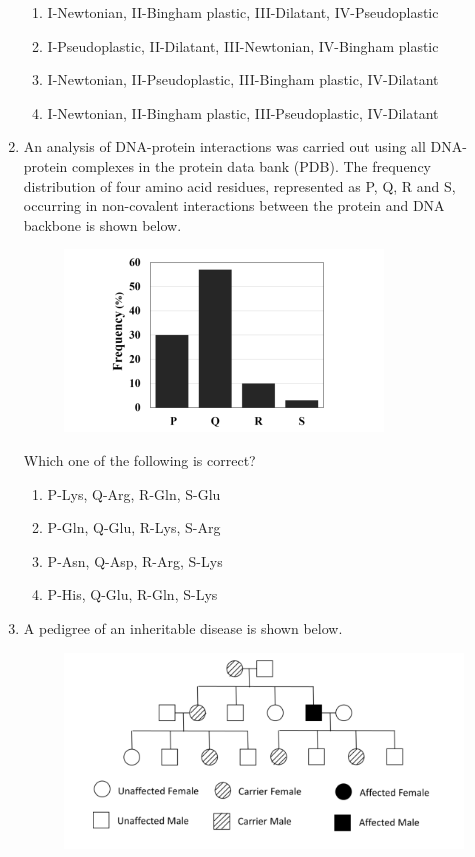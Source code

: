 \documentclass[journal,12pt,onecolumn]{IEEEtran}
\theoremstyle{remark}
\begin{document}
\begin{enumerate}
    \begin{enumerate}
        \item I-Newtonian, II-Bingham plastic, III-Dilatant, IV-Pseudoplastic
        \item I-Pseudoplastic, II-Dilatant, III-Newtonian, IV-Bingham plastic
        \item I-Newtonian, II-Pseudoplastic, III-Bingham plastic, IV-Dilatant
        \item I-Newtonian, II-Bingham plastic, III-Pseudoplastic, IV-Dilatant
    \end{enumerate}
    
    \item An analysis of DNA-protein interactions was carried out using all DNA-protein complexes in the protein data bank (PDB). The frequency distribution of four amino acid residues, represented as P, Q, R and S, occurring in non-covalent interactions between the protein and DNA backbone is shown below.
\begin{figure}[H]
    \centering
    \includegraphics[width = 0.5\columnwidth]{fig/Q37.png}
    \caption*{}
    \label{fig:Q37}
\end{figure}
   
    Which one of the following is correct?
    \begin{multicols}{2}
    \begin{enumerate}
        \item P-Lys, Q-Arg, R-Gln, S-Glu
        \item P-Gln, Q-Glu, R-Lys, S-Arg
        \item P-Asn, Q-Asp, R-Arg, S-Lys
        \item P-His, Q-Glu, R-Gln, S-Lys
    \end{enumerate}
    \end{multicols}

    \item A pedigree of an inheritable disease is shown below.
\begin{figure}[H]
    \centering
    \includegraphics[width = 0.5\columnwidth]{fig/Q38.png}
    \caption*{}
    \label{fig:Q38}
\end{figure}
   

\end{enumerate}
\end{document}
